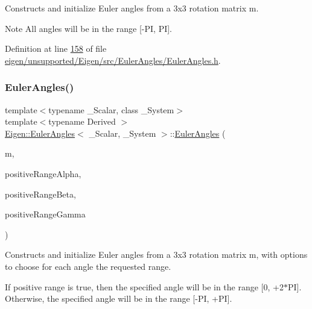 Constructs and initialize Euler angles from a 3x3 rotation matrix {\ttfamily m}.

\begin{DoxyNote}{Note}
All angles will be in the range \mbox{[}-\/\+PI, PI\mbox{]}. 
\end{DoxyNote}


Definition at line \hyperlink{eigen_2unsupported_2_eigen_2src_2_euler_angles_2_euler_angles_8h_source_l00158}{158} of file \hyperlink{eigen_2unsupported_2_eigen_2src_2_euler_angles_2_euler_angles_8h_source}{eigen/unsupported/\+Eigen/src/\+Euler\+Angles/\+Euler\+Angles.\+h}.

\mbox{\label{class_eigen_1_1_euler_angles_ab545bb022c56b1b93463c308f1bcc489}} 
\subsubsection{\texorpdfstring{Euler\+Angles()}{EulerAngles()}\hspace{0.1cm}{\footnotesize\ttfamily [4/12]}}
{\footnotesize\ttfamily template$<$typename \+\_\+\+Scalar, class \+\_\+\+System$>$ \\
template$<$typename Derived $>$ \\
\hyperlink{class_eigen_1_1_euler_angles}{Eigen\+::\+Euler\+Angles}$<$ \+\_\+\+Scalar, \+\_\+\+System $>$\+::\hyperlink{class_eigen_1_1_euler_angles}{Euler\+Angles} (\begin{DoxyParamCaption}\item[{const \hyperlink{group___core___module_class_eigen_1_1_matrix_base}{Matrix\+Base}$<$ Derived $>$ \&}]{m,  }\item[{bool}]{positive\+Range\+Alpha,  }\item[{bool}]{positive\+Range\+Beta,  }\item[{bool}]{positive\+Range\+Gamma }\end{DoxyParamCaption})\hspace{0.3cm}{\ttfamily [inline]}}

Constructs and initialize Euler angles from a 3x3 rotation matrix {\ttfamily m}, with options to choose for each angle the requested range.

If positive range is true, then the specified angle will be in the range \mbox{[}0, +2$\ast$\+PI\mbox{]}. Otherwise, the specified angle will be in the range \mbox{[}-\/\+PI, +\+PI\mbox{]}.


